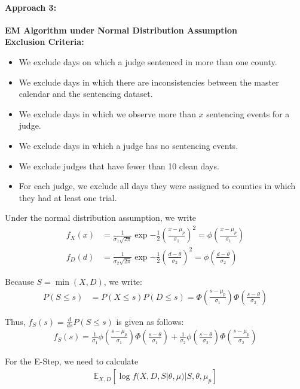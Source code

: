 \documentclass[11pt, oneside]{article}   	%
\theoremstyle{ModifiedStyle}
\begin{document}
			\paragraph{Approach 3:} \textbf{EM Algorithm under Normal Distribution Assumption}\\
			\textbf{Exclusion Criteria:}
			\begin{itemize}
				\item We exclude days on which a judge sentenced in more than one county.
				\item We exclude days in which there are inconsistencies between the master calendar
				and the sentencing dataset.
				\item We exclude days in which we observe more than $x$ sentencing events for a judge.
				\item We exclude days in which a judge has no sentencing events.
				\item We exclude judges that have fewer than 10 clean days.
				\item For each judge, we exclude all days they were assigned to counties in which they had at least one trial.
			\end{itemize} Under the normal distribution assumption, we write
			\begin{align*}
				f_X(x) &= \frac{1}{\sigma_1 \sqrt{2\pi}} \exp{-\frac{1}{2} (\frac{x-\mu_p}{\sigma_1})^2} = \phi(\frac{x-\mu_p}{\sigma_1})\\
				f_D(d) &= \frac{1}{\sigma_2 \sqrt{2\pi}} \exp{-\frac{1}{2} (\frac{d - \theta}{\sigma_2})^2} = \phi(\frac{d-\theta}{\sigma_2})
			\end{align*}

			Because $S = \min(X,D)$, we write:
			\begin{align*}
				P(S \leq s) &= P(X \leq s) P(D \leq s) = \Phi(\frac{s-\mu_p}{\sigma_1}) \Phi(\frac{s-\theta}{\sigma_2})
			\end{align*}

			Thus, $f_S(s) = \frac{d}{ds} P(S \leq s)$ is given as follows:
			\begin{align*}
				f_S(s) = \frac{1}{\sigma_1} \phi(\frac{s-\mu_p}{\sigma_1}) \Phi(\frac{s-\theta}{\sigma_1}) + \frac{1}{\sigma_2}\phi(\frac{s-\theta}{\sigma_2}) \Phi(\frac{s-\mu_p}{\sigma_2})
			\end{align*}

			For the E-Step, we need to calculate
			\begin{align*}
				\mathbb{E}_{X,D}[\log f(X,D,S|\theta,\mu) | S,\theta,\mu_p]
			\end{align*}
\end{document}
